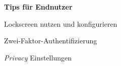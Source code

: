 \begin{frame}
	\centering
	\textbf{Tips für Endnutzer}
    		\begin{block}{}
				Lockscreen nutzen und konfigurieren
			\end{block}
			\begin{block}{}
				Zwei-Faktor-Authentifizierung
			\end{block}
			\begin{block}{}
				\textsl{Privacy} Einstellungen
			\end{block}
\end{frame}